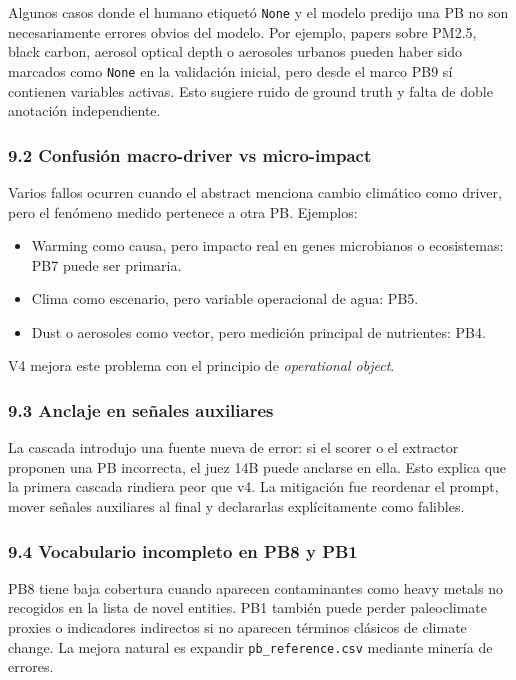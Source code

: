 Algunos casos donde el humano etiquetó \texttt{None} y el modelo predijo una PB no son necesariamente errores obvios del modelo. Por ejemplo, papers sobre PM2.5, black carbon, aerosol optical depth o aerosoles urbanos pueden haber sido marcados como \texttt{None} en la validación inicial, pero desde el marco PB9 sí contienen variables activas. Esto sugiere ruido de ground truth y falta de doble anotación independiente.

\subsubsection{9.2 Confusión macro-driver vs micro-impact}

Varios fallos ocurren cuando el abstract menciona cambio climático como driver, pero el fenómeno medido pertenece a otra PB. Ejemplos:

\begin{itemize}
\item Warming como causa, pero impacto real en genes microbianos o ecosistemas: PB7 puede ser primaria.
\item Clima como escenario, pero variable operacional de agua: PB5.
\item Dust o aerosoles como vector, pero medición principal de nutrientes: PB4.
\end{itemize}

V4 mejora este problema con el principio de \emph{operational object}.

\subsubsection{9.3 Anclaje en señales auxiliares}

La cascada introdujo una fuente nueva de error: si el scorer o el extractor proponen una PB incorrecta, el juez 14B puede anclarse en ella. Esto explica que la primera cascada rindiera peor que v4. La mitigación fue reordenar el prompt, mover señales auxiliares al final y declararlas explícitamente como falibles.

\subsubsection{9.4 Vocabulario incompleto en PB8 y PB1}

PB8 tiene baja cobertura cuando aparecen contaminantes como heavy metals no recogidos en la lista de novel entities. PB1 también puede perder paleoclimate proxies o indicadores indirectos si no aparecen términos clásicos de climate change. La mejora natural es expandir \texttt{pb\_reference.csv} mediante minería de errores.

